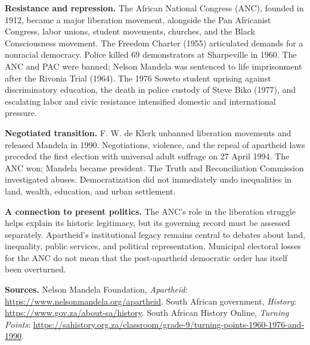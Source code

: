 \medskip\noindent
{\bf Resistance and repression.}
The African National Congress (ANC),
founded in 1912, became a major
liberation movement, alongside the
Pan Africanist Congress, labor
unions, student movements, churches,
and the Black Consciousness movement.
The Freedom Charter (1955) articulated
demands for a nonracial democracy.
Police killed 69 demonstrators
at Sharpeville in 1960. The ANC
and PAC were banned; Nelson Mandela
was sentenced to life imprisonment
after the Rivonia Trial (1964).
The 1976 Soweto student uprising
against discriminatory education,
the death in police custody of
Steve Biko (1977), and escalating
labor and civic resistance intensified
domestic and international pressure.

\medskip\noindent
{\bf Negotiated transition.}
F. W. de Klerk unbanned liberation
movements and released Mandela
in 1990. Negotiations, violence,
and the repeal of apartheid laws
preceded the first election with
universal adult suffrage on
27 April 1994. The ANC won;
Mandela became president.
The Truth and Reconciliation
Commission investigated abuses.
Democratization did not immediately
undo inequalities in land, wealth,
education, and urban settlement.

\medskip\noindent
{\bf A connection to present politics.}
The ANC's role in the liberation
struggle helps explain its historic
legitimacy, but its governing record
must be assessed separately.
Apartheid's institutional legacy
remains central to debates about
land, inequality, public services,
and political representation.
Municipal electoral losses for
the ANC do not mean that the
post-apartheid democratic order
has itself been overturned.

\medskip\noindent
{\bf Sources.}
Nelson Mandela Foundation,
\emph{Apartheid}:
\url{https://www.nelsonmandela.org/apartheid}.
South African government, \emph{History}:
\url{https://www.gov.za/about-sa/history}.
South African History Online,
\emph{Turning Points}:
\url{https://sahistory.org.za/classroom/grade-9/turning-points-1960-1976-and-1990}.





